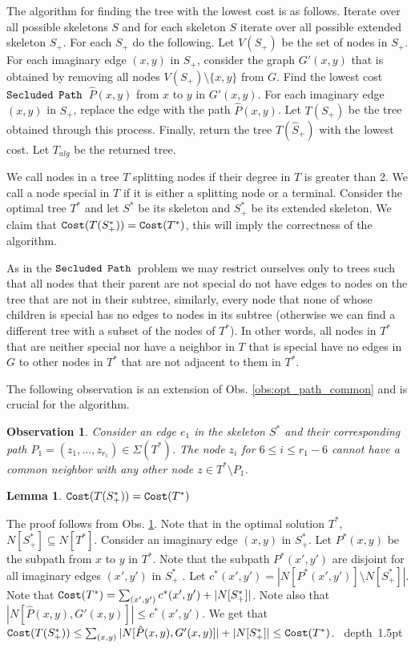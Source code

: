 \documentclass[12pt]{article}
\newtheorem{lemma}[theorem]{Lemma}
\newtheorem{observation}[theorem]{Observation}
\def\Cost{\mbox{\tt Cost}}
\def\Proof{\par\noindent{\bf Proof:~}}
\def\blackslug{\hbox{\hskip 1pt \vrule width 4pt height 8pt
    depth 1.5pt \hskip 1pt}}
\def\QED{\quad\blackslug\lower 8.5pt\null\par}
\newcommand{\PP}[0]{$\mbox{\tt Secluded}$ $\mbox{\tt Path}$}
\def\Cost{\mbox{\tt Cost}}
\begin{document}
The algorithm for finding the tree with the lowest cost  is as follows.
Iterate over all possible skeletons $S$ and for each skeleton $S$ iterate over all possible extended skeleton $S_{+}$.
For each $S_{+}$ do the following. Let $V(S_{+})$ be the set of nodes in $S_{+}$.
For each imaginary edge $(x,y)$ in $S_{+}$, consider the graph $G'(x,y)$ that is obtained by removing all nodes $V(S_{+}) \setminus \{x,y\}$ from $G$.
Find the lowest cost \PP\ $\hat{P}(x,y)$ from $x$ to $y$ in $G'(x,y)$.
For each imaginary edge $(x,y)$ in $S_{+}$, replace the edge with the path $\hat{P}(x,y)$. Let $T(S_{+})$ be the tree obtained through this process.
Finally, return the tree $T(\hat{S}_{+})$ with the lowest cost.
Let $T_{alg}$ be the returned tree.

We call nodes in a tree $T$ splitting nodes if their degree in $T$ is greater than 2.
We call a node special in $T$ if it is either a splitting node or a terminal.
Consider the optimal tree $T^*$ and let $S^*$ be its skeleton and $S^{*}_{+}$ be its extended skeleton.
We claim that $\Cost(T(S^{*}_{+})) = \Cost(T^{*})$, this will imply the correctness of the algorithm.

As in the \PP\ problem we may restrict ourselves only to trees such that all nodes that their parent are not special do not have edges to nodes on the tree that are not in their subtree, similarly, every node that none of whose children is special has no edges to nodes in its subtree (otherwise we can find a different tree with a subset of the nodes of $T^*$). In other words, all nodes in $T^*$ that are neither special nor have a neighbor in $T$ that is special have no edges in $G$ to other nodes in $T^*$ that are not adjacent to them in $T^*$.

The following observation is an extension of Obs. \ref {obs:opt_path_common} and is crucial for the algorithm.
\begin{observation}
\label{obs:tree-neighbors}
Consider an edge $e_1$ in the skeleton $S^*$ and their corresponding path $P_1=(z_1,...,z_{r_1}) \in \Sigma(T^{*})$.
The node $z_i$ for $6 \leq i \leq  r_1-6$ cannot have a common neighbor with any other node $z \in T^* \setminus P_1$.
\end{observation}





\begin{lemma}
$\Cost(T(S^{*}_{+})) = \Cost(T^{*})$
\end{lemma}
\Proof
The proof follows from Obs. \ref{obs:tree-neighbors}.
Note that in the optimal solution $T^*$, $N[S^{*}_{+}]\subseteq  N[T^*]$.
Consider an imaginary edge $(x,y)$ in $S^{*}_{+}$. Let $P^*(x,y)$ be the subpath from $x$ to $y$ in $T^*$.
Note that the subpath $P^*(x',y')$ are disjoint for all imaginary edges $(x',y')$ in $S^{*}_{+}$ .
Let $c^*(x',y') = |N[P^*(x',y')] \setminus N[S^{*}_{+}]|$.
Note that $\Cost(T^*) = \sum_{(x',y')}{c^*(x',y')} + |N[S^{*}_{+}]|$.
Note also that $|N[\hat{P}(x,y),G'(x,y)]| \leq  c^*(x',y')$.
We get that $\Cost(T(S^{*}_{+})) \leq \sum_{(x,y)}{|N[\hat{P}(x,y),G'(x,y)]|} +  |N[S^{*}_{+}]| \leq \Cost(T^{*})$.
\QED
\end{document}
